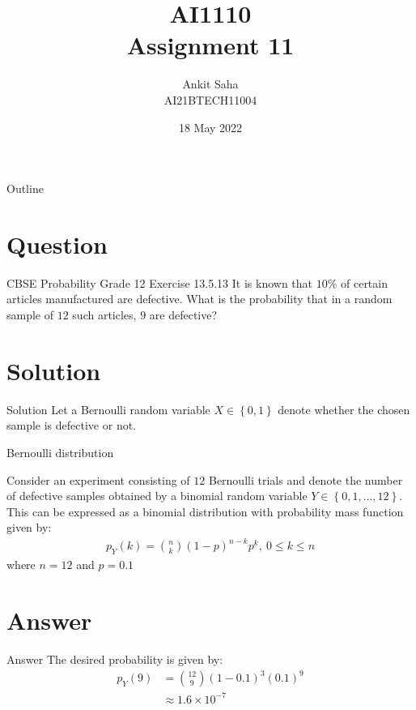 \documentclass{beamer}
\title{AI1110 \\ Assignment 11}
\author{Ankit Saha \\ AI21BTECH11004}
\date{18 May 2022}
\providecommand{\cbrak}[1]{\ensuremath{\left\{#1\right\}}}
\begin{document}
	\begin{frame}
		\titlepage
	\end{frame}
	
	\begin{frame}{Outline}
    		\tableofcontents
	\end{frame}
	
	\section{Question}
	\begin{frame}{CBSE Probability Grade 12 Exercise 13.5.13}
	It is known that $10\%$ of certain articles manufactured are defective. What is the probability that in a random sample of $12$ such articles, $9$ are defective?
	\end{frame}
	
	\section{Solution}
	\begin{frame}{Solution}
	Let a Bernoulli random variable $X \in \cbrak{0,1}$ denote whether the chosen sample is defective or not.
	\begin{table}[ht!]
		\centering
		
		\caption{Bernoulli distribution}
		\label{table:table1}	
	\end{table}
	\end{frame}
		
	\begin{frame}
	Consider an experiment consisting of $12$ Bernoulli trials and denote the number of defective samples obtained by a binomial random variable $Y \in \cbrak{0,1,\ldots,12}$. This can be expressed as a binomial distribution with probability mass function given by:
	\begin{align}
		p_Y(k) = \binom{n}{k} (1-p)^{n-k} p^k,~ 0 \le k \le n
	\end{align}
	where $n = 12$ and $p = 0.1$
	\end{frame}

	\section{Answer}
	\begin{frame}{Answer}
	The desired probability is given by:
	\begin{align}
		p_Y(9)&= \binom{12}{9} (1-0.1)^3 (0.1)^9 \\
		&\approx 1.6 \times 10^{-7}
	\end{align}
	\end{frame}
	
\end{document}
